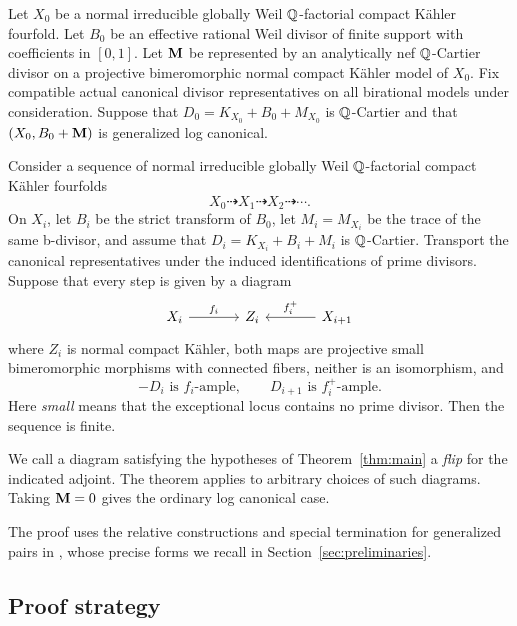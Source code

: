 \begin{theorem}\label{thm:main}
Let \(X_0\) be a normal irreducible globally Weil \(\mathbb{Q}\)-factorial compact K\"ahler fourfold. Let \(B_0\) be an effective rational Weil divisor of finite support with coefficients in \([0,1]\). Let \(\mathbf{M}\) be represented by an analytically nef \(\mathbb{Q}\)-Cartier divisor on a projective bimeromorphic normal compact K\"ahler model of \(X_0\). Fix compatible actual canonical divisor representatives on all birational models under consideration. Suppose that \(D_0=K_{X_0}+B_0+M_{X_0}\) is \(\mathbb{Q}\)-Cartier and that \((X_0,B_0+\mathbf{M})\) is generalized log canonical.

Consider a sequence of normal irreducible globally Weil \(\mathbb{Q}\)-factorial compact K\"ahler fourfolds
\[
 X_0\dashrightarrow X_1\dashrightarrow X_2\dashrightarrow\cdots.
\]
On \(X_i\), let \(B_i\) be the strict transform of \(B_0\), let \(M_i=M_{X_i}\) be the trace of the same b-divisor, and assume that \(D_i=K_{X_i}+B_i+M_i\) is \(\mathbb{Q}\)-Cartier. Transport the canonical representatives under the induced identifications of prime divisors. Suppose that every step is given by a diagram
\begin{equation}\label{eq:flip-diagram}
\begin{tikzcd}[column sep=large]
 X_i \arrow[r,"f_i"] & Z_i & X_{i+1}\arrow[l,"f_i^+"']
\end{tikzcd}
\end{equation}
where \(Z_i\) is normal compact K\"ahler, both maps are projective small bimeromorphic morphisms with connected fibers, neither is an isomorphism, and
\[
 -D_i\text{ is }f_i\text{-ample},\qquad
 D_{i+1}\text{ is }f_i^+\text{-ample}.
\]
Here \emph{small} means that the exceptional locus contains no prime divisor. Then the sequence is finite.
\end{theorem}

We call a diagram satisfying the hypotheses of Theorem~\ref{thm:main} a \emph{flip} for the indicated adjoint. The theorem applies to arbitrary choices of such diagrams. Taking \(\mathbf{M}=0\) gives the ordinary log canonical case.

The proof uses the relative constructions and special termination for generalized pairs in \cite{KahlerAuxiliary}, whose precise forms we recall in Section~\ref{sec:preliminaries}.

\subsection*{Proof strategy}

